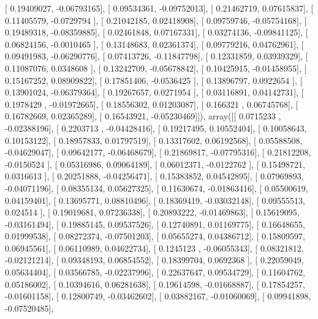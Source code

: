 \documentclass{article}
\begin{document}
       [ 0.19409027, -0.06793165],
       [ 0.09534361, -0.09752013],
       [ 0.21462719,  0.07615837],
       [ 0.11405579, -0.0729794 ],
       [ 0.21042185,  0.02418908],
       [ 0.09759746, -0.05754168],
       [ 0.19489318, -0.08359885],
       [ 0.02461848,  0.07167331],
       [ 0.03274136, -0.09841125],
       [ 0.06824156, -0.0010465 ],
       [ 0.13148683,  0.02361374],
       [ 0.09779216,  0.04762961],
       [ 0.09491983, -0.06290776],
       [ 0.07413726, -0.11847798],
       [ 0.12331859,  0.03939329],
       [ 0.11087076,  0.0348608 ],
       [ 0.13242709, -0.05678842],
       [ 0.10425915, -0.01458955],
       [ 0.15167252,  0.08909822],
       [ 0.17851406, -0.0536425 ],
       [ 0.13896797,  0.0922654 ],
       [ 0.13901024, -0.06379364],
       [ 0.19267657,  0.0271954 ],
       [ 0.03116891,  0.04142731],
       [ 0.1978429 , -0.01972665],
       [ 0.18556302,  0.01203087],
       [ 0.166321  ,  0.06745768],
       [ 0.16782669,  0.02365289],
       [ 0.16543921, -0.05230469]]), array([[ 0.0715233 , -0.02388196],
       [ 0.2203713 , -0.04428416],
       [ 0.19217495,  0.10552404],
       [ 0.10058643,  0.10153122],
       [ 0.18957833,  0.01797519],
       [ 0.13317602,  0.06192568],
       [ 0.05588508, -0.04629047],
       [ 0.09642177, -0.06468679],
       [ 0.21869817, -0.07795316],
       [ 0.21812208, -0.0150524 ],
       [ 0.05316986,  0.09064189],
       [ 0.06012371, -0.0122762 ],
       [ 0.15498721,  0.0316613 ],
       [ 0.20251888, -0.04256471],
       [ 0.15383852,  0.04542895],
       [ 0.07969893, -0.04071196],
       [ 0.08355134,  0.05627325],
       [ 0.11630674, -0.01863416],
       [ 0.05500619,  0.04159401],
       [ 0.13695771,  0.08810496],
       [ 0.18369419, -0.03032148],
       [ 0.09555513,  0.024514  ],
       [ 0.19019681,  0.07236338],
       [ 0.20893222, -0.01469863],
       [ 0.15619095, -0.03161494],
       [ 0.19885145,  0.09537526],
       [ 0.12740891,  0.01169775],
       [ 0.16648655,  0.01999538],
       [ 0.08272374, -0.07501203],
       [ 0.05655274,  0.04386712],
       [ 0.15809597,  0.06945561],
       [ 0.06110989,  0.04622734],
       [ 0.1245123 , -0.06055343],
       [ 0.08321812, -0.02121214],
       [ 0.09348193,  0.06854552],
       [ 0.18399704,  0.0692368 ],
       [ 0.22059049,  0.05634404],
       [ 0.03566785, -0.02237996],
       [ 0.22637647,  0.09534729],
       [ 0.11604762,  0.05186002],
       [ 0.10394616,  0.06281638],
       [ 0.19614598, -0.01668887],
       [ 0.17854257, -0.01601158],
       [ 0.12800749, -0.03462602],
       [ 0.03882167, -0.01060069],
       [ 0.09941898, -0.07520485],
\end{document}
